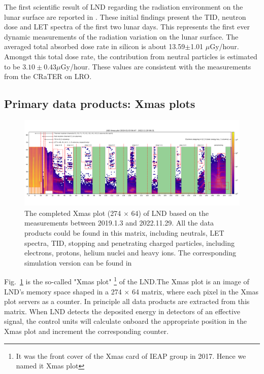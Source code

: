 The first scientific result of \ac{LND} regarding the radiation environment on the lunar surface are reported in \citep{Zhang-2020-LND-firstresults}. These initial findings present the \ac{TID}, neutron dose and \ac{LET} spectra of the first two lunar days. This represents the first ever dynamic measurements of the radiation variation on the lunar surface. The averaged total absorbed dose rate in silicon is about 13.59$\pm$1.01 $\mu$Gy/hour. Amongst this total dose rate, the contribution from neutral particles is estimated to be $3.10 \pm 0.43 \mu$Gy/hour. These values are consistent with the measurements from the \ac{CRaTER} on \ac{LRO}.



\subsection{Primary data products: Xmas plots}
\label{sec:xmas}

\begin{figure}
    \centering
    \includegraphics[width =0.95\textheight, height = 0.4\textheight, angle = 90]{images/xmas-2019-01-03To2022-11-29.png}
    \caption[\ac{LND} Xmas plot from measurements]{The completed Xmas plot (274 $\times$ 64) of \ac{LND} based on the measurements between 2019.1.3 and 2022.11.29. All the data products could be found in this matrix, including neutrals, \ac{LET} spectra, \ac{TID}, stopping and penetrating charged particles, including electrons, protons, helium nuclei and heavy ions. The corresponding simulation version can be found in \citep{Wimmer2020SSRv}}
    \label{Fig:measurement_Xmas}
\end{figure}

Fig.~\ref{Fig:measurement_Xmas} is the so-called "Xmas plot" \footnote{It was the front cover of the Xmas card of IEAP group in 2017. Hence we named it Xmas plot} of the \ac{LND}.The Xmas plot is an image of \ac{LND}'s memory space shaped in a 274 $\times$ 64 matrix, where each pixel in the Xmas plot servers as a counter. In principle all data products are extracted from this matrix. 
When \ac{LND} detects the deposited energy in detectors of an effective signal, the control units will calculate onboard the appropriate position in the Xmas plot and increment the corresponding counter. 

